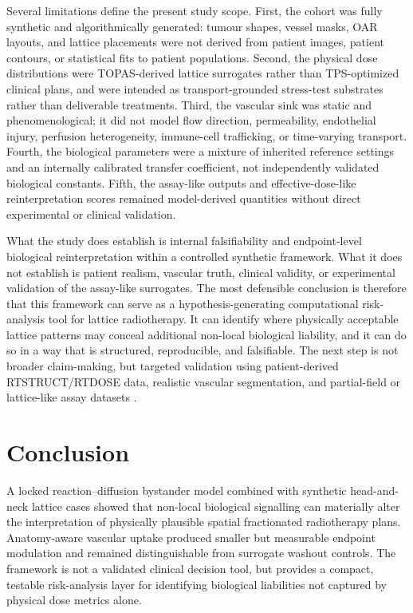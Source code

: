\documentclass[10pt,a4paper]{article}
\begin{document}
Several limitations define the present study scope. First, the cohort was fully synthetic and algorithmically generated: tumour shapes, vessel masks, OAR layouts, and lattice placements were not derived from patient images, patient contours, or statistical fits to patient populations. Second, the physical dose distributions were TOPAS-derived lattice surrogates rather than TPS-optimized clinical plans, and were intended as transport-grounded stress-test substrates rather than deliverable treatments. Third, the vascular sink was static and phenomenological; it did not model flow direction, permeability, endothelial injury, perfusion heterogeneity, immune-cell trafficking, or time-varying transport. Fourth, the biological parameters were a mixture of inherited reference settings and an internally calibrated transfer coefficient, not independently validated biological constants. Fifth, the assay-like outputs and effective-dose-like reinterpretation scores remained model-derived quantities without direct experimental or clinical validation.

What the study does establish is internal falsifiability and endpoint-level biological reinterpretation within a controlled synthetic framework. What it does not establish is patient realism, vascular truth, clinical validity, or experimental validation of the assay-like surrogates. The most defensible conclusion is therefore that this framework can serve as a hypothesis-generating computational risk-analysis tool for lattice radiotherapy. It can identify where physically acceptable lattice patterns may conceal additional non-local biological liability, and it can do so in a way that is structured, reproducible, and falsifiable. The next step is not broader claim-making, but targeted validation using patient-derived RTSTRUCT/RTDOSE data, realistic vascular segmentation, and partial-field or lattice-like assay datasets \cite{duriseti2021lattice,kavanaugh2022planning,duriseti2022phase,grams2023clinical,zhang2023lattice,botti2024latticeopt}.



\section{Conclusion}
A locked reaction--diffusion bystander model combined with synthetic head-and-neck lattice cases showed that non-local biological signalling can materially alter the interpretation of physically plausible spatial fractionated radiotherapy plans. Anatomy-aware vascular uptake produced smaller but measurable endpoint modulation and remained distinguishable from surrogate washout controls. The framework is not a validated clinical decision tool, but provides a compact, testable risk-analysis layer for identifying biological liabilities not captured by physical dose metrics alone.
\end{document}
